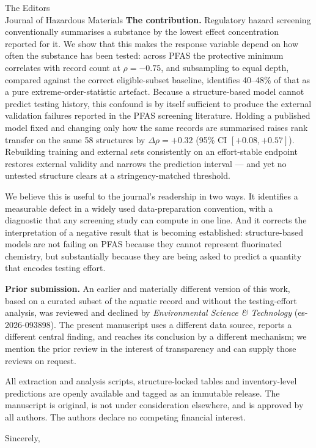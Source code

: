 \documentclass[11pt]{letter}
\begin{document}
\begin{letter}{The Editors\\Journal of Hazardous Materials}
\textbf{The contribution.} Regulatory hazard screening conventionally summarises
a substance by the lowest effect concentration reported for it. We show that
this makes the response variable depend on how often the substance has been
tested: across PFAS the protective minimum correlates with record count at
$\rho=-0.75$, and subsampling to equal depth, compared against the correct
eligible-subset baseline, identifies 40--48\% of that as a pure
extreme-order-statistic artefact. Because a structure-based model cannot
predict testing history, this confound is by itself sufficient to produce the
external validation failures reported in the PFAS screening literature. Holding
a published model fixed and changing only how the same records are summarised
raises rank transfer on the same 58 structures by $\Delta\rho=+0.32$
(95\% CI $[+0.08,+0.57]$). Rebuilding training and
external sets consistently on an effort-stable endpoint restores external
validity and narrows the prediction interval --- and yet no untested structure
clears at a stringency-matched threshold.

We believe this is useful to the journal's readership in two ways. It identifies
a measurable defect in a widely used data-preparation convention, with a
diagnostic that any screening study can compute in one line. And it corrects the
interpretation of a negative result that is becoming established: structure-based
models are not failing on PFAS because they cannot represent fluorinated
chemistry, but substantially because they are being asked to predict a quantity
that encodes testing effort.

\textbf{Prior submission.} An earlier and materially different version of this
work, based on a curated subset of the aquatic record and without the
testing-effort analysis, was reviewed and declined by \textit{Environmental
Science \& Technology} (es-2026-093898). The present manuscript uses a different
data source, reports a different central finding, and reaches its conclusion by
a different mechanism; we mention the prior review in the interest of
transparency and can supply those reviews on request.

All extraction and analysis scripts, structure-locked tables and inventory-level
predictions are openly available and tagged as an immutable release. The
manuscript is original, is not under consideration elsewhere, and is approved by
all authors. The authors declare no competing financial interest.

\closing{Sincerely,}
\end{letter}
\end{document}
